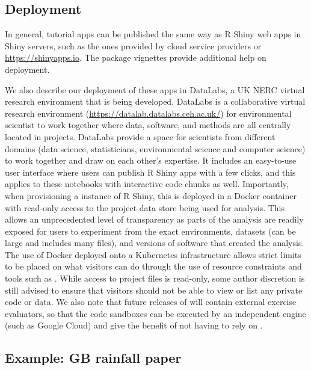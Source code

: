 \hypertarget{deployment}{%
\subsection{Deployment}\label{deployment}}

In general,  tutorial apps can be published the same way as
R Shiny web apps in Shiny servers, such as the ones provided by cloud
service providers or \url{https://shinyapps.io}. The 
package vignettes provide additional help on deployment.

We also describe our deployment of these apps in DataLabs, a UK NERC
virtual research environment that is being developed. DataLabs is a
collaborative virtual research environment \citep{Hollaway2020}
(\url{https://datalab.datalabs.ceh.ac.uk/}) for environmental scientist
to work together where data, software, and methods are all centrally
located in projects. DataLabs provide a space for scientists from
different domains (data science, statisticians, environmental science
and computer science) to work together and draw on each other's
expertise. It includes an easy-to-use user interface where users can
publish R Shiny apps with a few clicks, and this applies to these
notebooks with interactive code chunks as well. Importantly, when
provisioning a instance of R Shiny, this is deployed in a Docker
container with read-only access to the project data store being used for
analysis. This allows an unprecedented level of transparency as parts of
the analysis are readily exposed for users to experiment from the exact
environments, datasets (can be large and includes many files), and
versions of software that created the analysis. The use of Docker
deployed onto a Kubernetes infrastructure allows strict limits to be
placed on what visitors can do through the use of resource constraints
and tools such as  \citep{RAppArmor}. While access to
project files is read-only, some author discretion is still advised to
ensure that visitors should not be able to view or list any private code
or data. We also note that future releases of  will contain
external exercise evaluators, so that the code sandboxes can be executed
by an independent engine (such as Google Cloud) and give the benefit of
not having to rely on .

\hypertarget{example-gb-rainfall-paper}{%
\subsection{Example: GB rainfall
paper}\label{example-gb-rainfall-paper}}


